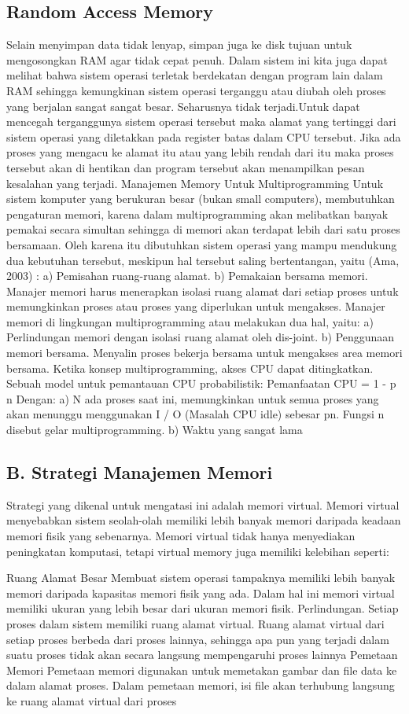 \subsection {Random Access Memory}
Selain menyimpan data tidak lenyap, simpan juga ke disk tujuan untuk mengosongkan RAM agar tidak cepat penuh.
Dalam sistem ini kita juga dapat melihat bahwa sistem operasi terletak berdekatan dengan program lain dalam RAM sehingga kemungkinan sistem operasi terganggu atau diubah oleh proses yang berjalan sangat sangat besar. Seharusnya tidak terjadi.Untuk dapat  mencegah terganggunya sistem operasi tersebut maka alamat yang tertinggi dari sistem operasi yang diletakkan pada register batas dalam CPU tersebut. Jika ada proses yang mengacu ke alamat itu atau yang lebih rendah dari itu maka proses tersebut akan di hentikan dan program tersebut akan menampilkan pesan kesalahan yang terjadi. Manajemen Memory  Untuk Multiprogramming
Untuk sistem komputer yang berukuran besar (bukan small computers), membutuhkan pengaturan memori, karena dalam multiprogramming akan melibatkan banyak pemakai secara simultan sehingga di memori akan terdapat lebih dari satu proses bersamaan.  Oleh karena itu dibutuhkan sistem operasi yang mampu mendukung dua kebutuhan tersebut, meskipun hal tersebut saling bertentangan, yaitu (Ama, 2003) :
a)      Pemisahan ruang-ruang alamat.
b)      Pemakaian bersama memori.
Manajer memori harus menerapkan isolasi ruang alamat dari setiap proses untuk memungkinkan proses atau proses yang diperlukan untuk mengakses. Manajer memori di lingkungan multiprogramming atau melakukan dua hal, yaitu:
a) Perlindungan memori dengan isolasi ruang alamat oleh dis-joint.
b) Penggunaan memori bersama.
Menyalin proses bekerja bersama untuk mengakses area memori bersama. Ketika konsep multiprogramming, akses CPU dapat ditingkatkan. Sebuah model untuk pemantauan CPU probabilistik:
Pemanfaatan CPU = 1 - p n
Dengan:
a) N ada proses saat ini, memungkinkan untuk semua proses yang akan menunggu menggunakan I / O (Masalah CPU idle) sebesar pn. Fungsi n disebut gelar multiprogramming.
b) Waktu yang sangat lama
\subsection {B. Strategi Manajemen Memori}
Strategi yang dikenal untuk mengatasi ini adalah memori virtual. Memori virtual menyebabkan sistem seolah-olah memiliki lebih banyak memori daripada keadaan memori fisik yang sebenarnya. Memori virtual tidak hanya menyediakan peningkatan komputasi, tetapi virtual memory juga memiliki kelebihan seperti:

Ruang Alamat Besar
Membuat sistem operasi tampaknya memiliki lebih banyak memori daripada kapasitas memori fisik yang ada. Dalam hal ini memori virtual memiliki ukuran yang lebih besar dari ukuran memori fisik.
Perlindungan.
Setiap proses dalam sistem memiliki ruang alamat virtual. Ruang alamat virtual dari setiap proses berbeda dari proses lainnya, sehingga apa pun yang terjadi dalam suatu proses tidak akan secara langsung mempengaruhi proses lainnya
Pemetaan Memori
Pemetaan memori digunakan untuk memetakan gambar dan file data ke dalam alamat proses. Dalam pemetaan memori, isi file akan terhubung langsung ke ruang alamat virtual dari proses